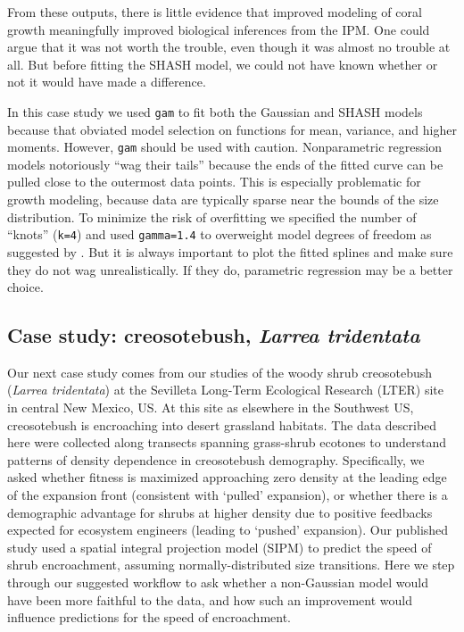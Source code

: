 \documentclass[12pt]{article}
\begin{document}
From these outputs, there is little evidence that improved modeling of coral growth meaningfully improved biological inferences from the IPM. 
One could argue that it was not worth the trouble, even though it was almost no trouble at all. But before 
fitting the SHASH model, we could not have known whether or not it would have made a difference.

In this case study we used \texttt{gam} to fit both the Gaussian and SHASH models because that obviated model selection on functions for mean, variance, and higher moments. 
However, \texttt{gam} should be used with caution. 
Nonparametric regression models notoriously ``wag their tails'' because the ends of the fitted curve can be pulled close to the outermost data points. 
This is especially problematic for growth modeling, because data are typically sparse near the bounds of the size distribution. 
To minimize the risk of overfitting we specified the number of ``knots'' (\texttt{k=4}) and used \texttt{gamma=1.4} to overweight model degrees of freedom as suggested by \citet[][sec. 3.2]{gu-2013}. 
But it is always important to plot the fitted splines and make sure they do not wag unrealistically. 
If they do, parametric regression may be a better choice. 

\subsection{Case study: creosotebush, \emph{Larrea tridentata}}
Our next case study comes from our studies of the woody shrub creosotebush (\emph{Larrea tridentata}) at the Sevilleta Long-Term Ecological Research (LTER) site in central New Mexico, US. 
At this site as elsewhere in the Southwest US, creosotebush is encroaching into desert grassland habitats.
The data described here were collected along transects spanning grass-shrub ecotones to understand patterns of density dependence in creosotebush demography.
Specifically, we asked whether fitness is maximized approaching zero density at the leading edge of the expansion front (consistent with `pulled' expansion), or whether there is a demographic advantage for shrubs at higher density due to positive feedbacks expected for ecosystem engineers (leading to `pushed' expansion). 
Our published study \citep{drees2023demography} used a spatial integral projection model (SIPM) to predict the speed of shrub encroachment, assuming normally-distributed size transitions. 
Here we step through our suggested workflow to ask whether a non-Gaussian model would have been more faithful to the data, and how such an improvement would influence predictions for the speed of encroachment.
\end{document}
